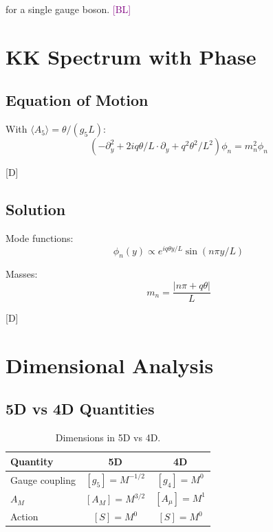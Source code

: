 \documentclass[11pt,a4paper]{article}
\newcommand{\tagD}{\textcolor{blue!70!black}{[D]}}
\newcommand{\tagBL}{\textcolor{purple}{[BL]}}
\begin{document}
for a single gauge boson. \tagBL

\section{KK Spectrum with Phase}
\label{app:kk}

\subsection{Equation of Motion}

With $\langle A_5 \rangle = \theta/(g_5 L)$:
\begin{equation}
\label{eq:app-eom}
(-\partial_y^2 + 2i q \theta / L \cdot \partial_y + q^2 \theta^2/L^2) \phi_n = m_n^2 \phi_n
\end{equation}

\tagD

\subsection{Solution}

Mode functions:
\begin{equation}
\label{eq:app-modes}
\phi_n(y) \propto e^{i q \theta y / L} \sin(n\pi y / L)
\end{equation}

Masses:
\begin{equation}
\label{eq:app-masses}
m_n = \frac{|n\pi + q\theta|}{L}
\end{equation}

\tagD

\section{Dimensional Analysis}
\label{app:dim}

\subsection{5D vs 4D Quantities}

\begin{table}[h]
\centering
\begin{tabular}{lcc}
\toprule
Quantity & 5D & 4D \\
\midrule
Gauge coupling & $[g_5] = M^{-1/2}$ & $[g_4] = M^0$ \\
$A_M$ & $[A_M] = M^{3/2}$ & $[A_\mu] = M^1$ \\
Action & $[S] = M^0$ & $[S] = M^0$ \\
\bottomrule
\end{tabular}
\caption{Dimensions in 5D vs 4D.}
\label{tab:app-dim}
\end{table}
\end{document}
